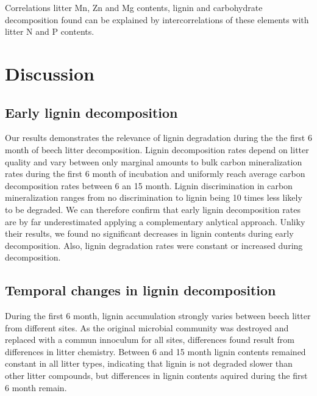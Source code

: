 \documentclass[authoryear,preprint,review,12pt]{elsarticle}
\begin{document}
Correlations litter Mn, Zn and Mg contents, lignin and carbohydrate decomposition found can be explained by intercorrelations of these elements with litter N and P contents.

\section{Discussion}
\subsection{Early lignin decomposition}
Our results demonstrates the relevance of lignin degradation during the the first 6 month of beech litter decomposition. Lignin decomposition rates depend on litter quality and vary between only marginal amounts to bulk carbon mineralization rates during the first 6 month of incubation and uniformly reach average carbon decomposition rates between 6 an 15 month. Lignin discrimination in carbon mineralization ranges from no discrimination to lignin being 10 times less likely to be degraded. We can therefore confirm that early lignin decomposition rates are by far underestimated \citep{Klotzbucher2011} applying a complementary anlytical approach. Unliky their results, we found no significant decreases in lignin contents during early decomposition. Also, lignin degradation rates were constant or increased during decomposition.


\subsection{Temporal changes in lignin decomposition}
During the first 6 month, lignin accumulation strongly varies between beech litter from different sites. As the original microbial community was destroyed and replaced with a commun innoculum for all sites, differences found result from differences in litter chemistry. Between 6 and 15 month lignin contents remained constant in all litter types, indicating that lignin is not degraded slower than other litter compounds, but differences in lignin contents aquired during the first 6 month remain.
\end{document}

